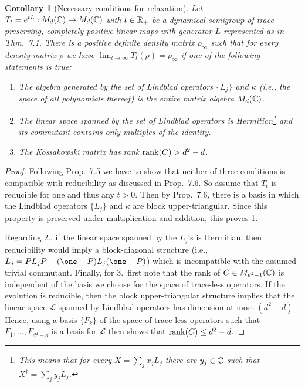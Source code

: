 \documentclass[11pt,a4paper]{article}
\theoremstyle{plain}
\newtheorem{corollary}{Corollary}
\begin{document}
\begin{corollary}[Necessary conditions for relaxation]
    Let $T_t=e^{tL}:M_d(\mathbb{C})\to M_d(\mathbb{C})$ with $t\in\mathbb{R}_{+}$ be a dynamical semigroup of trace-preserving, completely positive linear maps with generator $L$ represented as in Thm.~7.1. There is a positive definite density matrix $\rho_\infty$ such that for every density matrix $\rho$ we have $\lim_{t\to\infty}T_t(\rho)=\rho_\infty$ if one of the following statements is true:
    \begin{enumerate}
        \item The algebra generated by the set of Lindblad operators $\{L_j\}$ and $\kappa$ (i.e., the space of all polynomials thereof) is the entire matrix algebra $M_d(\mathbb{C})$.
        \item The linear space spanned by the set of Lindblad operators is Hermitian\footnote{This means that for every $X=\sum_j x_jL_j$ there are $y_j\in\mathbb{C}$ such that $X^{\dagger}=\sum_j y_jL_j$.} and its commutant contains only multiples of the identity.
        \item The Kossakowski matrix has rank $\operatorname{rank}(C)>d^2-d$.
    \end{enumerate}
\end{corollary}

\begin{proof}
    Following Prop.~7.5 we have to show that neither of three conditions is compatible with reducibility as discussed in Prop.~7.6. So assume that $T_t$ is reducible for one and thus any $t>0$. Then by Prop.~7.6, there is a basis in which the Lindblad operators $\{L_j\}$ and $\kappa$ are block upper-triangular. Since this property is preserved under multiplication and addition, this proves 1.

    Regarding 2., if the linear space spanned by the $L_j$'s is Hermitian, then reducibility would imply a block-diagonal structure (i.e., $L_j = PL_jP + (\one-P)L_j(\one-P)$) which is incompatible with the assumed trivial commutant. Finally, for 3.\ first note that the rank of $C\in M_{d^2-1}(\mathbb{C})$ is independent of the basis we choose for the space of trace-less operators. If the evolution is reducible, then the block upper-triangular structure implies that the linear space $\mathcal{L}$ spanned by Lindblad operators has dimension at most $(d^2-d)$. Hence, using a basis $\{F_k\}$ of the space of trace-less operators such that $F_1,\ldots,F_{d^2-d}$ is a basis for $\mathcal{L}$ then shows that $\operatorname{rank}(C)\le d^2-d$.
\end{proof}
\end{document}
